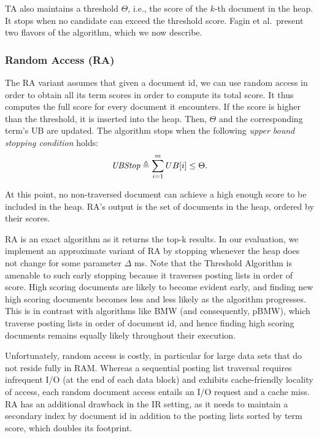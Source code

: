 TA also maintains a threshold $\Theta$, i.e., the score of the $k$-th document in the heap.
It stops when no candidate can exceed the threshold score. 
Fagin et al.\ present two flavors of the algorithm, which we now describe.

\subsubsection{Random Access (RA)} 
The RA variant assumes that given a document id, we can use random access in order to obtain all its term scores in order to compute its total score. It thus computes the full score for every document it encounters. If the score is higher than the threshold, it is inserted into the heap. Then, $\Theta$ and the corresponding term's UB are updated. The algorithm stops when 
the following \emph{upper bound stopping condition} holds:
\begin{equation} \label{eq:stop}
\textit{UBStop} \triangleq \sum_{i=1}^m UB[i] \le \Theta.
\end{equation}

At this point, no non-traversed document can achieve a high enough score to be included in the heap. RA's output is the set of documents in the heap, ordered by their scores.

RA is an exact  algorithm as it returns the top-k results. In our evaluation, we implement an approximate variant of RA by stopping whenever the heap does not change for some parameter $\Delta$ ms. 
Note that the Threshold Algorithm is amenable to such early stopping because it traverses posting lists in order of score. High scoring documents are likely to become evident early, and finding new high scoring documents becomes less and less likely as the algorithm progresses. This is in contrast with algorithms like BMW (and consequently, pBMW), which traverse posting lists in order of document id, and hence finding high scoring documents remains equally likely throughout their execution.

Unfortunately, random access is costly,  in particular for large data sets that do not reside fully in RAM.
Whereas a sequential posting list traversal requires infrequent I/O (at the end of each data block) and exhibits cache-friendly locality of access,  each random document access entails an I/O request and a cache miss.  
RA has an additional drawback in the IR setting, as it needs to maintain a secondary index by document id in addition to the posting lists sorted by term score, which doubles its footprint. 


